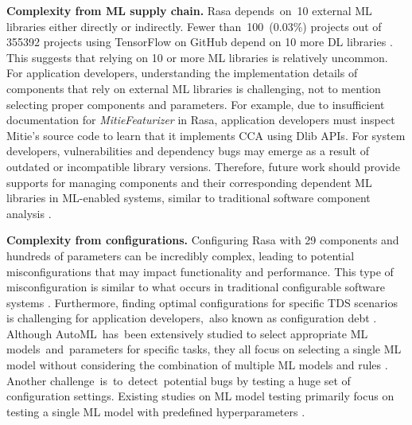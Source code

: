 \textbf{Complexity from ML supply chain.} Rasa depends~on~10 external ML libraries either directly or indirectly. Fewer than~100~(0.03\%) projects out of 355392 projects using TensorFlow on GitHub depend on 10 more DL libraries \cite{supply_chain}. This suggests that relying on 10 or more ML libraries is relatively uncommon.
For application developers, understanding the implementation details of components that rely on external ML libraries is challenging, not to mention selecting proper components and parameters. For example, due to insufficient documentation for \textit{MitieFeaturizer} in Rasa, application developers must inspect Mitie's source code to learn that it implements CCA using Dlib APIs. 
For system developers, vulnerabilities \cite{npm_technical_lag} and dependency bugs \cite{dependency_bug} may emerge as a result of outdated or incompatible library versions. 
Therefore, future work should provide supports for managing components and their corresponding dependent ML libraries in ML-enabled systems, similar to traditional software component analysis \cite{Foo2019TheDO}.

\textbf{Complexity from configurations.} Configuring Rasa with 29 components and hundreds of parameters can be incredibly complex, leading to potential misconfigurations that may impact functionality and performance. This type of misconfiguration is similar to what occurs in traditional configurable software systems \cite{configurable_system}. Furthermore, finding optimal configurations for specific TDS scenarios is challenging for application developers,~also known as configuration debt \cite{hidden_technical_debt}. Although AutoML~has~been extensively studied to select appropriate ML models~and~parameters for specific tasks, they all focus on selecting a single ML model without considering the combination of multiple ML models and rules  \cite{XinHe2021AutoMLAS}. Another challenge~is~to~detect~potential bugs by testing a huge set of configuration settings. Existing studies on ML model testing primarily focus on testing a single ML model with predefined hyperparameters \cite{ml_testing}.
 
